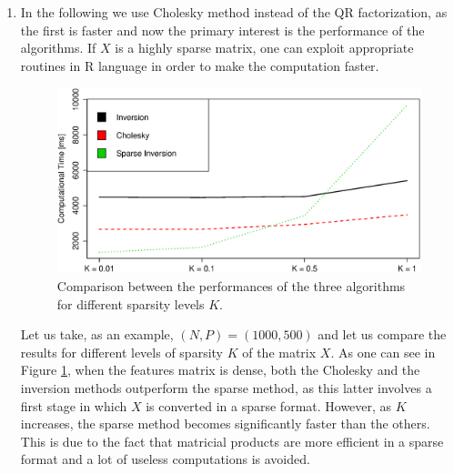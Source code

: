 \documentclass{homework}
\begin{document}
\begin{enumerate}[label=(\Alph*)]
\item In the following we use Cholesky method instead of the QR factorization, as the first is faster and now the primary interest is the performance of the algorithms. If $X$ is a highly sparse matrix, one can exploit appropriate routines in R language in order to make the computation faster. 

\begin{figure}[!ht]
\centering
\includegraphics[width=0.6\columnwidth]{./Img/perf_2}
\caption{Comparison between the performances of the three algorithms for different sparsity levels $K$.}
\label{fig:perf2}
\end{figure}

Let us take, as an example, $(N, P) = (1000,500)$ and let us compare the results for different levels of sparsity $K$ of the matrix $X$. As one can see in Figure \ref{fig:perf2}, when the features matrix is dense, both the Cholesky and the inversion methods outperform the sparse method, as this latter involves a first stage in which $X$ is converted in a sparse format. However, as $K$ increases, the sparse method becomes significantly faster than the others. This is due to the fact that matricial products are more efficient in a sparse format and a lot of useless computations is avoided.

\end{enumerate}

\end{document}

